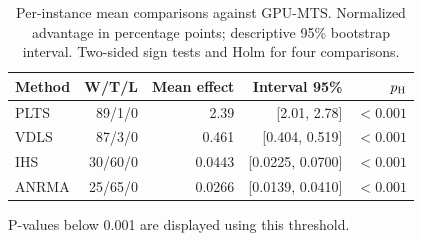 \begin{table}[tbp]\centering\small
\caption{Per-instance mean comparisons against GPU-MTS. Normalized advantage in percentage points; descriptive 95\% bootstrap interval. Two-sided sign tests and Holm for four comparisons.}
\label{tab:statistical}
\begin{tabular}{lrrrr}
\toprule
Method & W/T/L & Mean effect & Interval 95\% & $p_{\rm H}$\\
\midrule
PLTS & 89/1/0 & 2.39 & [2.01, 2.78] & $<0.001$\\
VDLS & 87/3/0 & 0.461 & [0.404, 0.519] & $<0.001$\\
IHS & 30/60/0 & 0.0443 & [0.0225, 0.0700] & $<0.001$\\
ANRMA & 25/65/0 & 0.0266 & [0.0139, 0.0410] & $<0.001$\\
\bottomrule\end{tabular}
\par\smallskip\parbox{.97\linewidth}{\footnotesize P-values below 0.001 are displayed using this threshold.}
\end{table}
